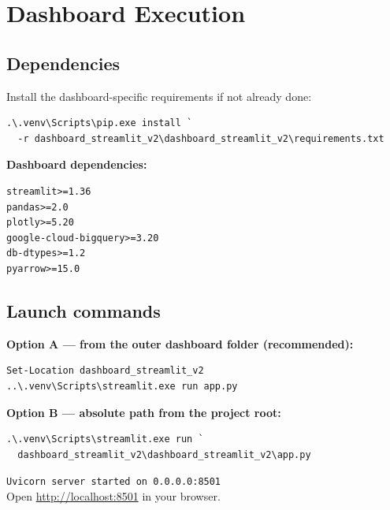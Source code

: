 \documentclass[11pt,a4paper]{article}
\begin{document}
\section{Dashboard Execution}

\subsection{Dependencies}

Install the dashboard-specific requirements if not already done:

\begin{lstlisting}[style=shell]
.\.venv\Scripts\pip.exe install `
  -r dashboard_streamlit_v2\dashboard_streamlit_v2\requirements.txt
\end{lstlisting}

\textbf{Dashboard dependencies:}

\begin{lstlisting}[style=shell,language={}]
streamlit>=1.36
pandas>=2.0
plotly>=5.20
google-cloud-bigquery>=3.20
db-dtypes>=1.2
pyarrow>=15.0
\end{lstlisting}

\subsection{Launch commands}

\textbf{Option A — from the outer dashboard folder (recommended):}

\begin{lstlisting}[style=shell]
Set-Location dashboard_streamlit_v2
..\.venv\Scripts\streamlit.exe run app.py
\end{lstlisting}

\textbf{Option B — absolute path from the project root:}

\begin{lstlisting}[style=shell]
.\.venv\Scripts\streamlit.exe run `
  dashboard_streamlit_v2\dashboard_streamlit_v2\app.py
\end{lstlisting}

\begin{tcolorbox}[successbox,title=Expected output]
\texttt{Uvicorn server started on 0.0.0.0:8501}\\[4pt]
Open \url{http://localhost:8501} in your browser.
\end{tcolorbox}
\end{document}
